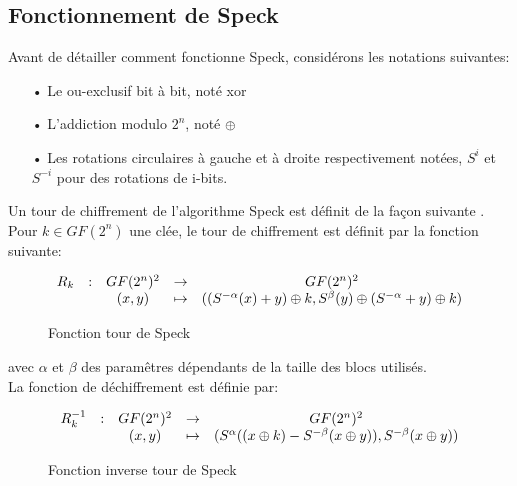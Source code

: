 		\subsection{Fonctionnement de Speck}

			Avant de détailler comment fonctionne Speck, considérons les notations suivantes:

			\begin{enumerate}
			  \item[•] Le ou-exclusif bit à bit, noté xor
			  \item[•] L'addiction modulo $2^n$, noté $\mathbin{\oplus}$
			  \item[•] Les rotations circulaires à gauche et à droite respectivement notées,
			    $S^i$ et $S^{-i}$ pour des rotations de i-bits.
			\end{enumerate}

			Un tour de chiffrement de l'algorithme Speck est définit de la façon suivante \cite{speck_families}. \\
			Pour $k \in GF(2^n)$ une clée, le tour de chiffrement est définit par la fonction suivante:

			\begin{figure}[H]
				\centering
				\[
				\begin{array}{ccccc}
				R_k & : & GF(2^n)^2 & \to & GF(2^n)^2 \\
				 & & (x,y) & \mapsto & ((S^{-\alpha}(x) + y) \mathbin{\oplus} k, S^\beta (y) \mathbin{\oplus} (S^{-\alpha} + y) \mathbin{\oplus} k) \\
				\end{array}
				\]
				\caption{Fonction tour de Speck}
				\label{tourSpeck}
			\end{figure}



			avec $\alpha$ et $\beta$ des paramêtres dépendants de la taille des blocs utilisés. \\

			La fonction de déchiffrement est définie par:

			\begin{figure}[H]
				\centering
				\[
				\begin{array}{ccccc}
				R_k^{-1} & : & GF(2^n)^2 & \to & GF(2^n)^2 \\
				 & & (x,y) & \mapsto & (S^\alpha ((x \mathbin{\oplus} k) - S^{-\beta}(x \mathbin{\oplus} y)), S^{-\beta}(x \mathbin{\oplus} y)) \\
				\end{array}
				\]
				\caption{Fonction inverse tour de Speck}
				\label{tourSpeck}
			\end{figure}


